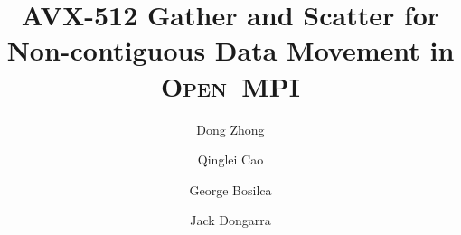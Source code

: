 \documentclass[conference]{IEEEtran}
\begin{document}
\newcommand{\mpifunc}[1]{\lstinline"MPI_#1"\xspace}
\newcommand{\prrte}[0]{\textsc{PRRTE}\xspace}
\newcommand{\pmix}[0]{\textsc{PMIx}\xspace}
\newcommand{\orte}[0]{\textsc{Open~RTE}\xspace}
\newcommand{\ompi}[0]{\textsc{Open~MPI}\xspace}
\newcommand{\mpi}[0]{\textsc{MPI}\xspace}
\newcommand{\arm}[0]{Arm\xspace}
\newcommand{\oshmem}[0]{\textsc{OpenSHMEM}\xspace}
\newcommand{\sve}[0]{\textsc{SVE}\xspace}
\newcommand{\armie}[0]{\textsc{ArmIE}\xspace}
\newcommand{\ddt}[0]{\textsc{DDT}\xspace}
\newcommand{\acle}[0]{\textsc{ACLE}\xspace}
\newcommand{\ourwork}[0]{\textsc{Optimized \ompi}\xspace}

\newcommand{\imb}[0]{\textsc{IMB}\xspace}

\title{AVX-512 Gather and Scatter for Non-contiguous Data Movement in \ompi
}

\makeatletter
\newcommand{\linebreakand}{%
  \end{@IEEEauthorhalign}
  \hfill\mbox{}\par
  \mbox{}\hfill\begin{@IEEEauthorhalign}
}
\makeatother

\author[1,2]{Dong Zhong}
\author[1,2]{Qinglei Cao}
\author[1,2]{George Bosilca}
\author[1,2]{Jack Dongarra}

\IEEEoverridecommandlockouts
{}

\maketitle
\end{document}
